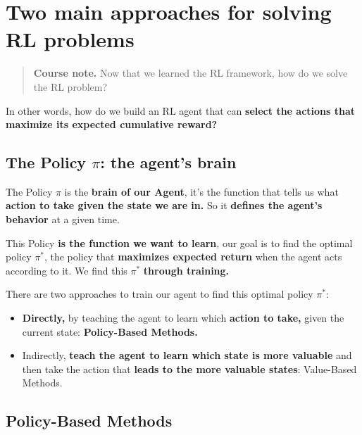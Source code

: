\documentclass[11pt,a4paper]{article}
\begin{document}
\section{Two main approaches for solving RL problems}\label{two-main-approaches-for-solving-rl-problems}

\begin{quote}
\textbf{Course note.} Now that we learned the RL framework, how do we solve the RL problem?
\end{quote}

In other words, how do we build an RL agent that can \textbf{select the actions that maximize its expected cumulative reward?}

\subsection{The Policy \texorpdfstring{$\pi$}{pi}: the agent's brain}\label{the-policy-ux3c0-the-agents-brain}

The Policy \textbf{$\pi$} is the \textbf{brain of our Agent}, it's the function that tells us what \textbf{action to take given the state we are in.} So it \textbf{defines the agent's behavior} at a given time.


This Policy \textbf{is the function we want to learn}, our goal is to find the optimal policy $\pi^*$, the policy that \textbf{maximizes expected return} when the agent acts according to it. We find this $\pi^*$ \textbf{through training.}

There are two approaches to train our agent to find this optimal policy $\pi^*$:

\begin{itemize}
\tightlist
\item
  \textbf{Directly,} by teaching the agent to learn which \textbf{action to take,} given the current state: \textbf{Policy-Based Methods.}
\item
  Indirectly, \textbf{teach the agent to learn which state is more valuable} and then take the action that \textbf{leads to the more valuable states}: Value-Based Methods.
\end{itemize}

\subsection{Policy-Based Methods}\label{policy-based-methods}
\end{document}
